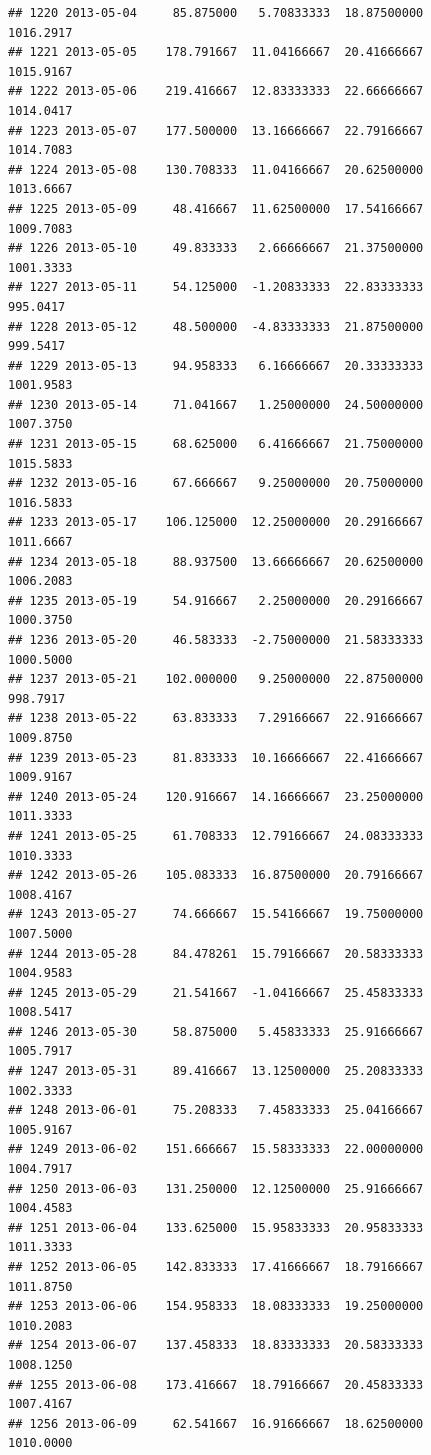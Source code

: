 \documentclass[
]{article}
\begin{document}
\begin{verbatim}
## 1220 2013-05-04     85.875000   5.70833333  18.87500000    1016.2917
## 1221 2013-05-05    178.791667  11.04166667  20.41666667    1015.9167
## 1222 2013-05-06    219.416667  12.83333333  22.66666667    1014.0417
## 1223 2013-05-07    177.500000  13.16666667  22.79166667    1014.7083
## 1224 2013-05-08    130.708333  11.04166667  20.62500000    1013.6667
## 1225 2013-05-09     48.416667  11.62500000  17.54166667    1009.7083
## 1226 2013-05-10     49.833333   2.66666667  21.37500000    1001.3333
## 1227 2013-05-11     54.125000  -1.20833333  22.83333333     995.0417
## 1228 2013-05-12     48.500000  -4.83333333  21.87500000     999.5417
## 1229 2013-05-13     94.958333   6.16666667  20.33333333    1001.9583
## 1230 2013-05-14     71.041667   1.25000000  24.50000000    1007.3750
## 1231 2013-05-15     68.625000   6.41666667  21.75000000    1015.5833
## 1232 2013-05-16     67.666667   9.25000000  20.75000000    1016.5833
## 1233 2013-05-17    106.125000  12.25000000  20.29166667    1011.6667
## 1234 2013-05-18     88.937500  13.66666667  20.62500000    1006.2083
## 1235 2013-05-19     54.916667   2.25000000  20.29166667    1000.3750
## 1236 2013-05-20     46.583333  -2.75000000  21.58333333    1000.5000
## 1237 2013-05-21    102.000000   9.25000000  22.87500000     998.7917
## 1238 2013-05-22     63.833333   7.29166667  22.91666667    1009.8750
## 1239 2013-05-23     81.833333  10.16666667  22.41666667    1009.9167
## 1240 2013-05-24    120.916667  14.16666667  23.25000000    1011.3333
## 1241 2013-05-25     61.708333  12.79166667  24.08333333    1010.3333
## 1242 2013-05-26    105.083333  16.87500000  20.79166667    1008.4167
## 1243 2013-05-27     74.666667  15.54166667  19.75000000    1007.5000
## 1244 2013-05-28     84.478261  15.79166667  20.58333333    1004.9583
## 1245 2013-05-29     21.541667  -1.04166667  25.45833333    1008.5417
## 1246 2013-05-30     58.875000   5.45833333  25.91666667    1005.7917
## 1247 2013-05-31     89.416667  13.12500000  25.20833333    1002.3333
## 1248 2013-06-01     75.208333   7.45833333  25.04166667    1005.9167
## 1249 2013-06-02    151.666667  15.58333333  22.00000000    1004.7917
## 1250 2013-06-03    131.250000  12.12500000  25.91666667    1004.4583
## 1251 2013-06-04    133.625000  15.95833333  20.95833333    1011.3333
## 1252 2013-06-05    142.833333  17.41666667  18.79166667    1011.8750
## 1253 2013-06-06    154.958333  18.08333333  19.25000000    1010.2083
## 1254 2013-06-07    137.458333  18.83333333  20.58333333    1008.1250
## 1255 2013-06-08    173.416667  18.79166667  20.45833333    1007.4167
## 1256 2013-06-09     62.541667  16.91666667  18.62500000    1010.0000

\end{verbatim}
\end{document}
